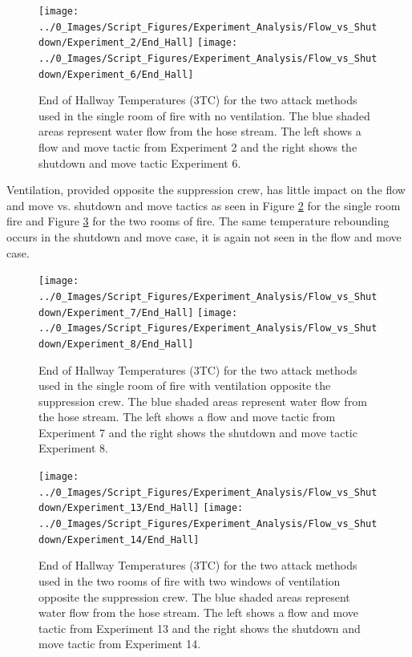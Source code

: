 \documentclass[12pt,oneside]{book}
\begin{document}
\begin{figure}[H]
\centering
\texttt{[image: ../0\_Images/Script\_Figures/Experiment\_Analysis/Flow\_vs\_Shutdown/Experiment\_2/End\_Hall]}
\texttt{[image: ../0\_Images/Script\_Figures/Experiment\_Analysis/Flow\_vs\_Shutdown/Experiment\_6/End\_Hall]}
\caption[Hall Temp. - No Vent - Flow \& Move vs. Shutdown \& Move]{End of Hallway Temperatures (3TC) for the two attack methods used in the single room of fire with no ventilation. The blue shaded areas represent water flow from the hose stream. The left shows a flow and move tactic from Experiment 2 and the right shows the shutdown and move tactic Experiment 6.}
\label{fig:Flow_vs_Shut_Single_No_Vent}
\end{figure}

Ventilation, provided opposite the suppression crew, has little impact on the flow and move vs. shutdown and move tactics as seen in Figure \ref{fig:Flow_vs_Shut_Single_Vent} for the single room fire and Figure \ref{fig:Flow_vs_Shut_Two_Vent} for the two rooms of fire. The same temperature rebounding occurs in the shutdown and move case, it is again not seen in the flow and move case. 

\begin{figure}[H]
\centering
\texttt{[image: ../0\_Images/Script\_Figures/Experiment\_Analysis/Flow\_vs\_Shutdown/Experiment\_7/End\_Hall]}
\texttt{[image: ../0\_Images/Script\_Figures/Experiment\_Analysis/Flow\_vs\_Shutdown/Experiment\_8/End\_Hall]}
\caption[Hall Temp. - Single Vent - Flow \& Move vs. Shutdown \& Move]{End of Hallway Temperatures (3TC) for the two attack methods used in the single room of fire with ventilation opposite the suppression crew. The blue shaded areas represent water flow from the hose stream. The left shows a flow and move tactic from Experiment 7 and the right shows the shutdown and move tactic Experiment 8.}
\label{fig:Flow_vs_Shut_Single_Vent}
\end{figure} 

\begin{figure}[H]
\centering
\texttt{[image: ../0\_Images/Script\_Figures/Experiment\_Analysis/Flow\_vs\_Shutdown/Experiment\_13/End\_Hall]}
\texttt{[image: ../0\_Images/Script\_Figures/Experiment\_Analysis/Flow\_vs\_Shutdown/Experiment\_14/End\_Hall]}
\caption[Hall Temp. - Two Vents - Flow \& Move vs. Shutdown \& Move]{End of Hallway Temperatures (3TC) for the two attack methods used in the two rooms of fire with two windows of ventilation opposite the suppression crew. The blue shaded areas represent water flow from the hose stream. The left shows a flow and move tactic from Experiment 13 and the right shows the shutdown and move tactic from Experiment 14.}
\label{fig:Flow_vs_Shut_Two_Vent}
\end{figure}
\end{document}
